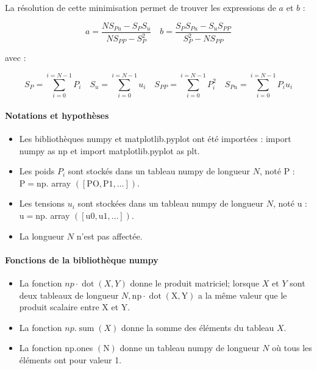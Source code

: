 La résolution de cette minimisation permet de trouver les expressions de $a$ et $b$ :

$$
a=\frac{N S_{P u}-S_{P} S_{u}}{N S_{P P}-S_{P}^{2}} \quad b=\frac{S_{P} S_{P u}-S_{u} S_{P P}}{S_{P}^{2}-N S_{P P}}
$$

avec :

$$
S_{P}=\sum_{i=0}^{i=N-1} P_{i} \quad S_{u}=\sum_{i=0}^{i=N-1} u_{i} \quad S_{P P}=\sum_{i=0}^{i=N-1} P_{i}^{2} \quad S_{P u}=\sum_{i=0}^{i=N-1} P_{i} u_{i}
$$

\paragraph{Notations et hypothèses}
\begin{itemize}
  \item Les bibliothèques numpy et matplotlib.pyplot ont été importées : import numpy as np et import matplotlib.pyplot as plt.

  \item Les poids $P_{i}$ sont stockés dans un tableau numpy de longueur $N$, noté $\mathrm{P}$ : $\mathrm{P}=\mathrm{np}$. array $([\mathrm{PO}, \mathrm{P} 1, \ldots])$.

  \item Les tensions $u_{i}$ sont stockées dans un tableau numpy de longueur $N$, noté u : $\mathrm{u}=\mathrm{np}$. array $([\mathrm{u} 0, \mathrm{u} 1, \ldots])$.

  \item La longueur $N$ n'est pas affectée.

\end{itemize}

\paragraph{Fonctions de la bibliothèque numpy}
\begin{itemize}
  \item La fonction $n p \cdot \operatorname{dot}(X, Y)$ donne le produit matriciel; lorsque $X$ et $Y$ sont deux tableaux de longueur $N, \mathrm{np} \cdot \operatorname{dot}(\mathrm{X}, \mathrm{Y})$ a la même valeur que le produit scalaire entre $\mathrm{X}$ et $\mathrm{Y}$.

  \item La fonction $n p . \operatorname{sum}(X)$ donne la somme des éléments du tableau $X$.

  \item La fonction np.ones $(\mathrm{N})$ donne un tableau numpy de longueur $N$ où tous les éléments ont pour valeur 1.

\end{itemize}


